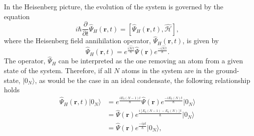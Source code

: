 In the Heisenberg picture, the evolution of the system is governed by the equation
\begin{equation}\label{eqn:heisenberg}
i\hbar \frac{\partial}{\partial t}\hat{\Psi}_H\left(\textbf{r}, t\right) = \left[\hat{\Psi}_{H}\left(\textbf{r}, t\right), \hat{\mathcal{H}}  \right],
\end{equation}
where the Heisenberg field annihilation operator, $\hat{\Psi}_H\left(\textbf{r}, t\right)$, is given by
\begin{equation}\label{eqn:psi_heisenberg}
\hat{\Psi}_H\left(\textbf{r}, {t} \right) = e^{\frac{i\hat{\mathcal{H}}t}{\hbar}}\hat{\Psi}\left(\textbf{r}\right) e^{\frac{-i\hat{\mathcal{H}}t}{\hbar}}.
\end{equation}
The operator, $\hat{\Psi}_H$ can be interpreted as the one removing an atom from a given state of the system. Therefore, if all $N$ atoms in the system are in the ground-state, $\vert 0_N\rangle$, as would be the case in an ideal condensate, the following relationship holds
\begin{subequations}
\begin{align}
\hat{\Psi}_{H}(\textbf{r},t)\vert 0_N \rangle &= e^{\frac{iE_0(N-1)t}{\hbar}}\hat{\Psi}(\textbf{r})e^{\frac{-iE_0(N)t}{\hbar}}\vert 0_N \rangle \\
&= \hat{\Psi}(\textbf{r})e^{\frac{i[E_0(N-1) - E_0(N)]t}{\hbar}} \vert 0_N \rangle \\
&= \hat{\Psi}(\textbf{r})e^{\frac{-i\mu t}{\hbar}} \vert 0_N \rangle,\label{eqn:psi_dagger_time} %
\end{align}
\end{subequations}

